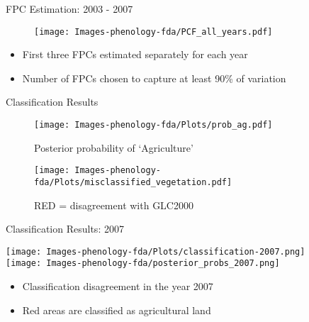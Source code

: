 \documentclass{beamer}
\begin{document}

\begin{frame}[t]{FPC Estimation: 2003 - 2007}
	\begin{minipage}{0.5\textwidth}
	\begin{figure}
	\texttt{[image: Images-phenology-fda/PCF\_all\_years.pdf]}
	\end{figure}
	\end{minipage}
	\begin{minipage}{0.46\textwidth}
		\begin{itemize}
			\item First three FPCs estimated separately for each year
			\item Number of FPCs chosen to capture at least 90\% of variation
		\end{itemize}
	\end{minipage}
\end{frame}

\begin{frame}{Classification Results}
	\begin{minipage}{0.45\textwidth}
		\begin{figure}
		\texttt{[image: Images-phenology-fda/Plots/prob\_ag.pdf]}
		\caption{Posterior probability of `Agriculture'}
		\end{figure}
	\end{minipage}
	\begin{minipage}{0.45\textwidth}
		\begin{figure}
		\texttt{[image: Images-phenology-fda/Plots/misclassified\_vegetation.pdf]}
		\caption{RED = disagreement with GLC2000}
		\end{figure}
	\end{minipage}
\end{frame}


\begin{frame}[t]{Classification Results: 2007}
	\begin{minipage}{.4\textwidth}
	\texttt{[image: Images-phenology-fda/Plots/classification-2007.png]}\\
	\texttt{[image: Images-phenology-fda/posterior\_probs\_2007.png]}
	\end{minipage}
	\begin{minipage}{.5\textwidth}
	 \begin{itemize}
	 	\item Classification disagreement in the year 2007
		\item Red areas are classified as agricultural land
	 \end{itemize}
	\end{minipage}
\end{frame}
\end{document}
